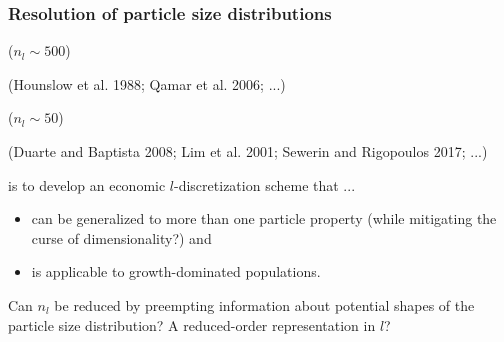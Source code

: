 \documentclass[10pt,xcolor=dvipsnames]{beamer}
\newcommand*{\itemskip}{0.25\baselineskip}
\begin{document}

\begin{frame}[t]
  
  \frametitle{Resolution of particle size distributions}
  
  \vspace{-\baselineskip}
  \begin{minipage}[t]{0.46\columnwidth}\vskip0pt
   ($n_l \sim 500$)
  \begin{center}
  \resizebox{0.65\columnwidth}{!}{}
  \end{center}
  \vspace{-\baselineskip}
  {\footnotesize(Hounslow et al. 1988; Qamar et al. 2006; ...)} \nocite{Hounslow1988, Qamar2006}
  \end{minipage}\hfill
  \begin{minipage}[t]{0.46\columnwidth}\vskip0pt
   ($n_l \sim 50$)
  \begin{center}
  \resizebox{0.65\columnwidth}{!}{}
  \end{center}
  \vspace{-\baselineskip}
  {\footnotesize(Duarte and Baptista 2008; Lim et al. 2001; Sewerin and Rigopoulos 2017; ...)} \nocite{Lim2001, Duarte2008, Sewerin2017}
  \end{minipage}
  \vspace{\baselineskip}

   is to develop an economic $l$-discretization scheme that ...
  \begin{itemize}
  \vspace{\itemskip}
  \item\justifying can be generalized to more than one particle property (while mitigating the curse of dimensionality?) and
  \vspace{\itemskip}
  \item is applicable to growth-dominated populations.
  \end{itemize}
  
  \begin{snugshade}
  \justifying Can $n_l$ be reduced by preempting information about potential shapes of the particle size distribution? A reduced-order representation in $l$?
  \end{snugshade}
  
\end{frame}
\end{document}
